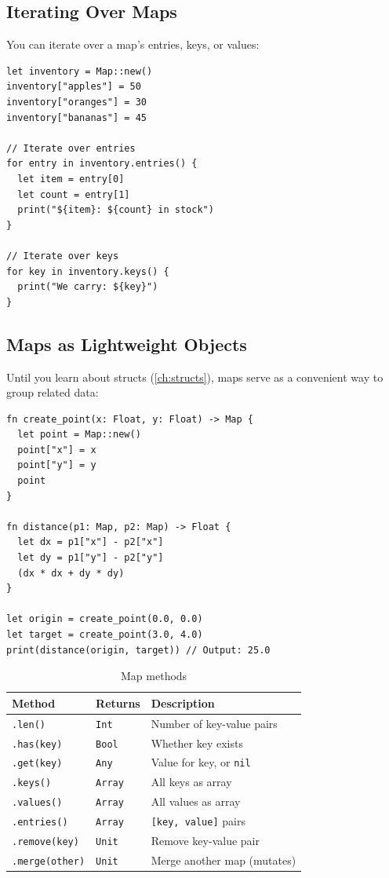 \subsection{Iterating Over Maps}\label{sec:map-iteration}

You can iterate over a map's entries, keys, or values:

\begin{lstlisting}[language=Lattice, caption={Iterating over maps}]
let inventory = Map::new()
inventory["apples"] = 50
inventory["oranges"] = 30
inventory["bananas"] = 45

// Iterate over entries
for entry in inventory.entries() {
  let item = entry[0]
  let count = entry[1]
  print("${item}: ${count} in stock")
}

// Iterate over keys
for key in inventory.keys() {
  print("We carry: ${key}")
}
\end{lstlisting}

\subsection{Maps as Lightweight Objects}\label{sec:maps-as-objects}

Until you learn about structs (\cref{ch:structs}), maps serve as a convenient way to group related data:

\begin{lstlisting}[language=Lattice, caption={Maps as ad-hoc objects}]
fn create_point(x: Float, y: Float) -> Map {
  let point = Map::new()
  point["x"] = x
  point["y"] = y
  point
}

fn distance(p1: Map, p2: Map) -> Float {
  let dx = p1["x"] - p2["x"]
  let dy = p1["y"] - p2["y"]
  (dx * dx + dy * dy)
}

let origin = create_point(0.0, 0.0)
let target = create_point(3.0, 4.0)
print(distance(origin, target)) // Output: 25.0
\end{lstlisting}

\begin{table}[ht]
\centering
\begin{tabular}{lll}
\toprule
\textbf{Method} & \textbf{Returns} & \textbf{Description} \\
\midrule
\lstinline|.len()| & \lstinline|Int| & Number of key-value pairs \\
\lstinline|.has(key)| & \lstinline|Bool| & Whether key exists \\
\lstinline|.get(key)| & \lstinline|Any| & Value for key, or \lstinline|nil| \\
\lstinline|.keys()| & \lstinline|Array| & All keys as array \\
\lstinline|.values()| & \lstinline|Array| & All values as array \\
\lstinline|.entries()| & \lstinline|Array| & \lstinline|[key, value]| pairs \\
\lstinline|.remove(key)| & \lstinline|Unit| & Remove key-value pair \\
\lstinline|.merge(other)| & \lstinline|Unit| & Merge another map (mutates) \\
\bottomrule
\end{tabular}
\caption{Map methods}\label{tab:map-methods}
\end{table}

